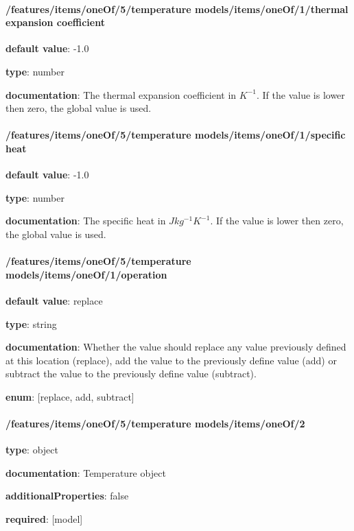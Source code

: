 \begin{itemized}
\end{itemized}\paragraph{/features/items/oneOf/5/temperature models/items/oneOf/1/thermal expansion coefficient} \begin{itemized}
\item {\bf default value}: -1.0
\item {\bf type}: number
\item {\bf documentation}: The thermal expansion coefficient in $K^{-1}$. If the value is lower then zero, the global value is used.
\end{itemized}\paragraph{/features/items/oneOf/5/temperature models/items/oneOf/1/specific heat} \begin{itemized}
\item {\bf default value}: -1.0
\item {\bf type}: number
\item {\bf documentation}: The specific heat in $J kg^{-1} K^{-1}$. If the value is lower then zero, the global value is used.
\end{itemized}\paragraph{/features/items/oneOf/5/temperature models/items/oneOf/1/operation} \begin{itemized}
\item {\bf default value}: replace
\item {\bf type}: string
\item {\bf documentation}: Whether the value should replace any value previously defined at this location (replace), add the value to the previously define value (add) or subtract the value to the previously define value (subtract).
\item {\bf enum}: [replace, add, subtract]\end{itemized}\paragraph{/features/items/oneOf/5/temperature models/items/oneOf/2} \begin{itemized}
\item {\bf type}: object
\item {\bf documentation}: Temperature object
\item {\bf additionalProperties}: false
\item {\bf required}: [model]\end{itemized}
